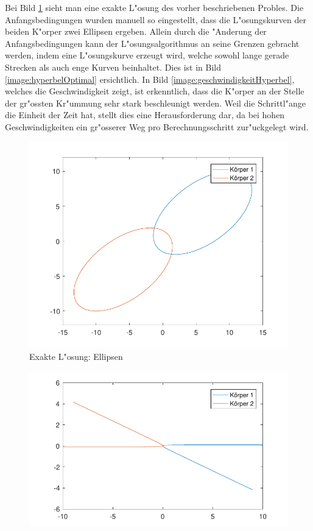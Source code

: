\begin{refsection}
Bei Bild \ref{image:ellipseOptimal} sieht man eine exakte L"osung des vorher beschriebenen Probles.
Die Anfangsbedingungen wurden manuell so eingestellt, dass die L"osungskurven der beiden K"orper zwei Ellipsen ergeben.
%
Allein durch die "Anderung der Anfangsbedingungen kann der L"osungsalgorithmus an seine Grenzen gebracht werden, indem eine L"osungskurve erzeugt wird, welche sowohl lange gerade Strecken als auch enge Kurven beinhaltet.
Dies ist in Bild \ref{image:hyperbelOptimal} ersichtlich.
In Bild \ref{image:geschwindigkeitHyperbel}, welches die Geschwindigkeit zeigt, ist erkenntlich, dass die K"orper an der Stelle der gr"ossten Kr"ummung sehr stark beschleunigt werden.
Weil die Schrittl"ange die Einheit der Zeit hat, stellt dies eine Herausforderung dar, da bei hohen Geschwindigkeiten ein gr"osserer Weg pro Berechnungsschritt zur"uckgelegt wird.
\begin{figure}
\centering
\includegraphics{schrittlaenge/images/ellipseOptimal.pdf}
\caption{Exakte L"osung: Ellipsen}
\label{image:ellipseOptimal}
\end{figure}
\begin{figure}
\centering
\includegraphics{schrittlaenge/images/hyperbelOptimal.pdf}

\end{figure}
\end{refsection}
